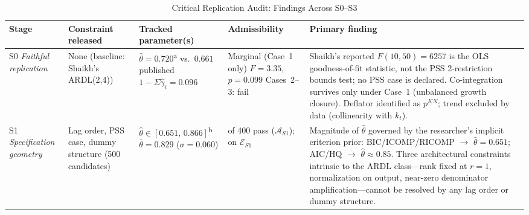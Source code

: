 \begin{table}[H]
	\centering
	\scriptsize
	\caption{Critical Replication Audit: Findings Across S0--S3}
	\label{tab:S_closure}
	\setlength{\tabcolsep}{4pt}
	\renewcommand{\arraystretch}{1.25}
	\begin{threeparttable}
	\begin{tabular}{@{}
			>{\raggedright\arraybackslash}p{2.0cm}
			>{\raggedright\arraybackslash}p{2.8cm}
			>{\raggedright\arraybackslash}p{2.6cm}
			>{\raggedright\arraybackslash}p{2.8cm}
			>{\raggedright\arraybackslash}p{4.8cm}
			@{}}
		\toprule
		\textbf{Stage} &
		\textbf{Constraint released} &
		\textbf{Tracked parameter(s)} &
		\textbf{Admissibility} &
		\textbf{Primary finding} \\
		\midrule
		\addlinespace[4pt]
		
		S0\newline
		\textit{Faithful replication} &
		None\newline
		(baseline: Shaikh's\newline
		ARDL(2,4)) &
		$\hat\theta = 0.720$\textsuperscript{a}\newline
		vs.\ $0.661$ published\newline
		$1{-}\Sigma\hat\gamma_i = 0.096$ &
		Marginal (Case~1 only)\newline
		$F = 3.35$, $p = 0.099$\newline
		Cases~2--3: fail &
		Shaikh's reported $F(10,50) = 6257$ is the OLS
		goodness-of-fit statistic, not the PSS 2-restriction
		bounds test; no PSS case is declared. Co-integration
		survives only under Case~1 (unbalanced growth closure).
		Deflator identified as $p^{KN}$; trend excluded by
		data (collinearity with $k_t$). \\
		
		\addlinespace[6pt]
		
		S1\newline
		\textit{Specification geometry} &
		Lag order, PSS case,\newline
		dummy structure\newline
		(500 candidates) &
		$\hat\theta\in[0.651,\,0.866]$\textsuperscript{b}\newline
		$\bar\theta = 0.829$\newline
		($\sigma = 0.060$) &
		65 of 400 pass\newline
		($\mathcal{A}_{S1}$);\newline
		17 on $\mathcal{E}_{S1}$ &
		Magnitude of $\hat\theta$ governed by the researcher's
		implicit criterion prior: BIC/ICOMP/RICOMP $\to$
		$\hat\theta = 0.651$; AIC/HQ $\to$
		$\hat\theta \approx 0.85$. Three architectural
		constraints intrinsic to the ARDL class---rank fixed at
		$r{=}1$, normalization on output, near-zero denominator
		amplification---cannot be resolved by any lag order or
		dummy structure. \\
		

\end{tabular}
\end{threeparttable}
\end{table}
